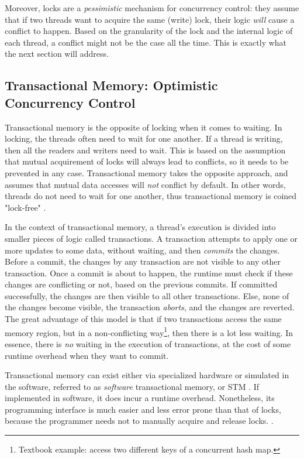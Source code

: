 Moreover, locks are a \textit{pessimistic} mechanism for concurrency control: they assume that if
two threads want to acquire the same (write) lock, their logic \textit{will} cause a conflict to
happen. Based on the granularity of the lock and the internal logic of each thread, a conflict might
not be the case all the time. This is exactly what the next section will address.

\subsection{Transactional Memory: Optimistic Concurrency Control} \label{chap_bg:subsec:stm}

Transactional memory is the opposite of locking when it comes to waiting. In locking, the threads
often need to wait for one another. If a thread is writing, then all the readers and writers need to
wait. This is based on the assumption that mutual acquirement of locks will always
lead to conflicts, so it needs to be prevented in any case. Transactional memory takes the opposite
approach, and assumes that mutual data accesses will \textit{not} conflict by default. In other
words, threads do not need to wait for one another, thus transactional memory is coined "lock-free"
\cite{knightArchitectureMostlyFunctional1986}.

In the context of transactional memory, a thread's execution is divided into smaller pieces of logic
called transactions. A transaction attempts to apply one or more updates to some data, without
waiting, and then \textit{commits} the changes. Before a commit, the changes by any transaction are
not visible to any other transaction. Once a commit is about to happen, the runtime must check if
these changes are conflicting or not, based on the previous commits. If committed successfully, the
changes are then visible to all other transactions. Else, none of the changes become visible, the
transaction \textit{aborts}, and the changes are reverted. The great advantage of this model is that
if two transactions access the same memory region, but in a non-conflicting way\footnote{Textbook
example: access two different keys of a concurrent hash map.}, then there is a lot less waiting. In
essence, there is \textit{no} waiting in the execution of transactions, at the cost of some runtime
overhead when they want to commit.

Transactional memory can exist either via specialized hardware or simulated in the software,
referred to as \textit{software} transactional memory, or STM
\cite{hammondTransactionalMemoryCoherence2004}. If implemented in software, it does incur a
runtime overhead. Nonetheless, its programming interface is much easier and less error prone than that of locks, because the programmer needs not to manually acquire and release locks.
\cite{herlihyTransactionalMemoryArchitectural1993}.

